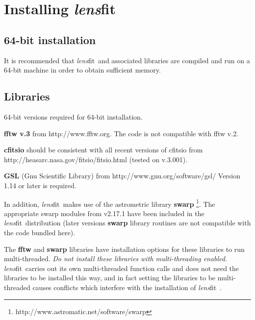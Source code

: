 \documentclass{article}
\title{\lensfitsuite}
\author{Lance Miller\\{\em L.Miller@physics.ox.ac.uk}}
\def\lensfitsuite{{\em lens}fit\ }
\begin{document}
\maketitle

\tableofcontents

\newpage

\section{Installing \lensfitsuite}

\subsection{64-bit installation}
It is recommended that \lensfitsuite and associated libraries are compiled and run on a 64-bit
machine in order to obtain sufficient memory.

\subsection{Libraries}\label{libraries}
64-bit versions required for 64-bit installation.

\begin{list}{}{\itemsep=0mm \leftmargin=5mm}
\item {\bf fftw v.3} from http://www.fftw.org. The code is not compatible with fftw v.2. 
\item {\bf cfitsio} should be consistent with all recent versions of cfitsio from 
http://heasarc.nasa.gov/fitsio/fitsio.html (tested on v.3.001). 
\item {\bf GSL} (Gnu Scientific Library) from http://www.gnu.org/software/gsl/ Version 1.14
or later is required.
\end{list}

In addition, \lensfitsuite makes use of the astrometric library {\bf swarp} \citep{bertin02a}
\footnote{http://www.astromatic.net/software/swarp}.
The appropriate swarp modules from v2.17.1 have been included in the \lensfitsuite distribution (later
versions {\bf swarp} library routines are not compatible with the code bundled here).

The {\bf fftw} and {\bf swarp} libraries have installation options for these libraries to run multi-threaded.
{\em Do not install these libraries with multi-threading enabled}.  \lensfitsuite carries out its own multi-threaded
function calls and does not need the libraries to be installed this way, and in fact setting the libraries
to be multi-threaded causes conflicts which interfere with the installation of \lensfitsuite.
\end{document}
